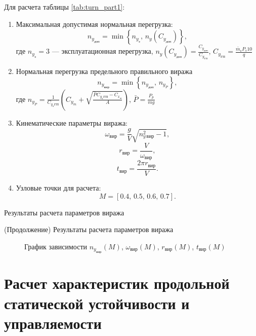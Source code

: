 Для расчета таблицы \ref{tab:turn_part1}: 
\begin{enumerate}
    \item Максимальная допустимая нормальная перегрузка:
        \[
            n_{y_{доп}}=\min \left\{ n_{y_{э}},\,n_y(C_{y_{доп}}) \right\},
        \]
        где $n_{y_{э}} = 3$ --- эксплуатационная перегрузка, $n_y(C_{y_{доп}}) = \frac{C_{y_{доп}}}{C_{y_{ГП}}}$,
        $C_{y_{ГП}} = \frac{\bar{m}_с P_s 10}{q}$
    \item Нормальная перегрузка предельного правильного виража
        \[
            n_{y_{вир}}=\min \left\{ n_{y_{доп}},\,n_{y_P} \right\},
        \]
        где $n_{y_{P}} = \frac{1}{C_{y_{a}ГП}} \left( C_{y_m} + \sqrt{
        \frac{\bar{P} C_{y_{a}ГП} - C_{x_{м}} }{A}} \right) $, $\bar{P} = \frac{P_p}{mg}$
    \item Кинематические параметры виража:
        \[
            \omega_{вир}  = \frac{g}{V} \sqrt{n_{y\, вир}^2 - 1},
        \]
        \[
            r_{вир} = \frac{V}{\omega_{вир}},
        \]
        \[
            t_{вир} = \frac{2 \pi r_{вир}}{V}.
        \]
        \item Узловые точки для расчета:
        \[
            M = [0.4,\, 0.5,\, 0.6,\,0.7].
        \]
\end{enumerate}

\begin{table}[H]
    \centering
    \caption{Результаты расчета параметров виража}
    \label{tab:turn_part1}
    
\end{table}

\addtocounter{table}{-1}
\addtocounter{totaltables}{-1}
\begin{table}[H]
    \centering
    \caption{(Продолжение) Результаты расчета параметров виража}
    \label{tab:turn_part2}
    
\end{table}
 
\begin{figure}[H]
\centering
\resizebox{.79\linewidth}{!}{}
\caption{График зависимости $n_{y_{вир}}(M)$, $\omega_{вир}(M)$, $r_{вир}(M)$, $t_{вир}(M)$}
\label{fig:turn}
\end{figure}

\section{Расчет характеристик продольной статической устойчивости и
управляемости}

